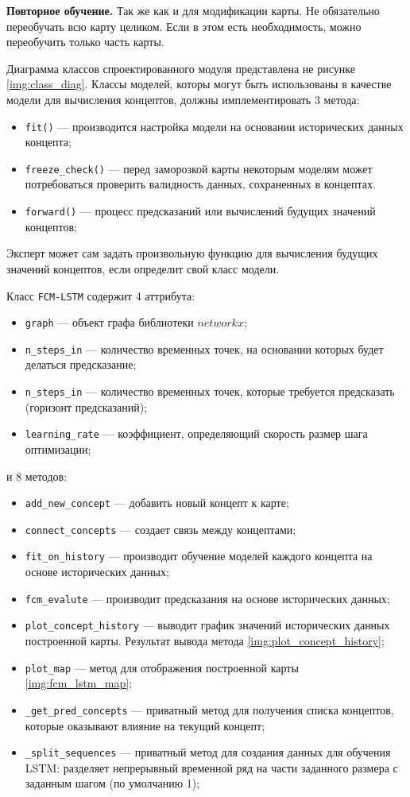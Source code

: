 \textbf{Повторное обучение.}
Так же как и для модификации карты. Не обязательно переобучать всю карту целиком.
Если в этом есть необходимость, можно переобучить только часть карты.

Диаграмма классов спроектированного модуля представлена не рисунке \ref{img:class_diag}.
Классы моделей, которы могут быть использованы в качестве модели для вычисления
концептов, должны имплементировать 3 метода:
\begin{itemize}
	\item \verb|fit()| --- производится настройка модели на основании исторических данных концепта;
	\item \verb|freeze_check()| --- перед заморозкой карты некоторым моделям может потребоваться проверить валидность данных,
	сохраненных в концептах.
	\item \verb|forward()| --- процесс предсказаний или вычислений будущих значений концептов;
\end{itemize}
\noindent Эксперт может сам задать произвольную функцию для
вычисления будущих значений концептов, если определит свой класс
модели.

\noindent Класс \verb|FCM-LSTM| содержит 4 аттрибута:
\begin{itemize}
	\item \verb|graph| --- объект графа библиотеки $ networkx $;
	\item \verb|n_steps_in| --- количество временных точек, на основании которых будет делаться предсказание;
	\item \verb|n_steps_in| --- количество временных точек, которые требуется предсказать (горизонт предсказаний);
	\item \verb|learning_rate| --- коэффициент, определяющий скорость размер шага оптимизации;
\end{itemize}
\noindent и 8 методов:
\begin{itemize}
	\item \verb|add_new_concept| --- добавить новый концепт к карте;
	\item \verb|connect_concepts| --- создает связь между концептами;
	\item \verb|fit_on_history| --- производит обучение моделей каждого концепта на основе исторических данных;
	\item \verb|fcm_evalute| --- производит предсказания на основе исторических данных;
	\item \verb|plot_concept_history| --- выводит график значений исторических данных построенной карты. Результат вывода метода \ref{img:plot_concept_history};
	\item \verb|plot_map| ---  метод для отображения построенной карты \ref{img:fcm_lstm_map};
	\item \verb|_get_pred_concepts| --- приватный метод для получения списка концептов, которые оказывают влияние на текущий концепт;
	\item \verb|_split_sequences| --- приватный метод для создания данных для обучения LSTM: разделяет непрерывный временной ряд на части заданного размера с заданным шагом (по умолчанию 1);
\end{itemize}

